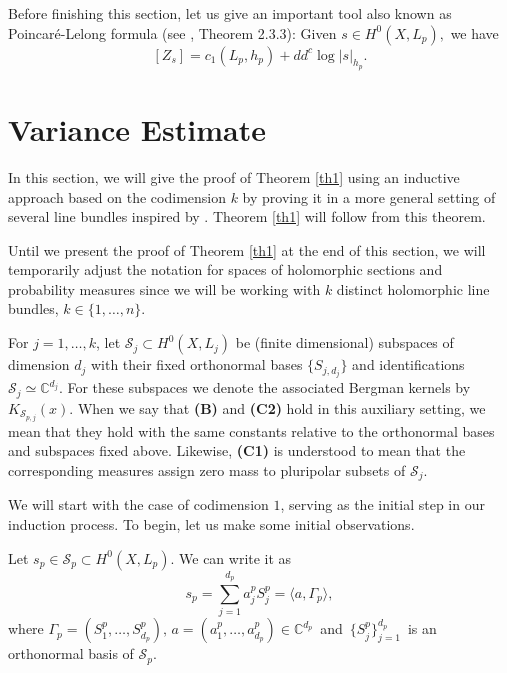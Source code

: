 \documentclass[11pt,leqno,oneside]{amsart}
\numberwithin{equation}{section}
\begin{document}
Before finishing this section, let us give an important tool also known as Poincar\'{e}-Lelong formula (see \cite{MM1}, Theorem 2.3.3): Given $s\in H^{0}(X, L_{p}),$ we have \begin{equation}\label{lelpoi}
  [Z_{s}]= c_{1}(L_{p}, h_{p})+ dd^{c}\log{|s|_{h_{p}}}.
\end{equation}



\section{Variance Estimate}\label{S3} In this section, we will give the proof of Theorem \ref{th1} using an inductive approach based on the codimension $k$ by proving it in a more general setting of several line bundles inspired by \cite[Theorem 3.1]{Shif}. Theorem \ref{th1} will follow from this theorem.

Until we present the proof of Theorem \ref{th1} at the end of this section, we will temporarily adjust the notation for spaces of holomorphic sections and probability measures since we will be working with $k$ distinct holomorphic line bundles, $k\in \{1, \ldots, n\}$.

 For $j=1, \ldots, k$, let $\mathcal{S}_{j} \subset H^{0}(X, L_{j})$ be (finite dimensional) subspaces of dimension $d_{j}$ with their fixed orthonormal bases $\{S_{j, d_{j}}\}$ and identifications $\mathcal{S}_{j} \simeq \mathbb{C}^{d_{j}}$. For these subspaces we denote the associated Bergman kernels by $K_{\mathcal{S}_{p,j}}(x)$.
When we say that \textbf{(B)} and \textbf{(C2)} hold in this auxiliary setting, we mean that they hold with the same constants relative to the orthonormal bases and subspaces fixed above. Likewise, \textbf{(C1)} is understood to mean that the corresponding measures assign zero mass to pluripolar subsets of $\mathcal{S}_j$.


We will start with the case of codimension $1$, serving as the initial step in our induction process. To begin, let us make some initial observations.

Let $s_{p} \in \mathcal{S}_{p} \subset H^{0}(X, L_{p})$. We can write it as $$s_{p}=\sum_{j=1}^{d_{p}}{a_{j}^{p}S^{p}_{j}}=\langle a, \Gamma_{p} \rangle,$$ where $\Gamma_{p}=(S_{1}^{p}, \ldots, S^{p}_{d_{p}}),\,a=(a_{1}^{p}, \ldots, a_{d_{p}}^{p})\in \mathbb{C}^{d_{p}}$\, and\, $\{S^{p}_{j}\}_{j=1}^{d_{p}}$\, is an orthonormal basis of $\mathcal{S}_{p}$.
\end{document}
